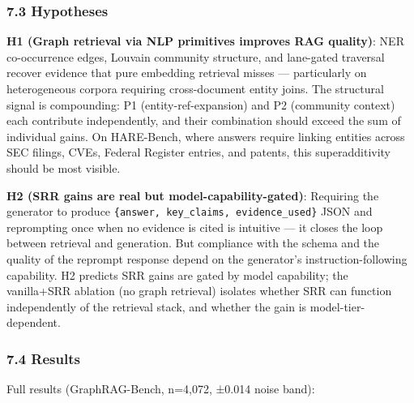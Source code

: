 \subsubsection{7.3 Hypotheses}\label{hypotheses}

\textbf{H1 (Graph retrieval via NLP primitives improves RAG quality)}: NER co-occurrence edges, Louvain community structure, and lane-gated traversal recover evidence that pure embedding retrieval misses --- particularly on heterogeneous corpora requiring cross-document entity joins. The structural signal is compounding: P1 (entity-ref-expansion) and P2 (community context) each contribute independently, and their combination should exceed the sum of individual gains. On HARE-Bench, where answers require linking entities across SEC filings, CVEs, Federal Register entries, and patents, this superadditivity should be most visible.

\textbf{H2 (SRR gains are real but model-capability-gated)}: Requiring the generator to produce \texttt{\{answer,\ key\_claims,\ evidence\_used\}} JSON and reprompting once when no evidence is cited is intuitive --- it closes the loop between retrieval and generation. But compliance with the schema and the quality of the reprompt response depend on the generator's instruction-following capability. H2 predicts SRR gains are gated by model capability; the vanilla+SRR ablation (no graph retrieval) isolates whether SRR can function independently of the retrieval stack, and whether the gain is model-tier-dependent.

\subsubsection{7.4 Results}\label{results}

Full results (GraphRAG-Bench, n=4,072, ±0.014 noise band):


